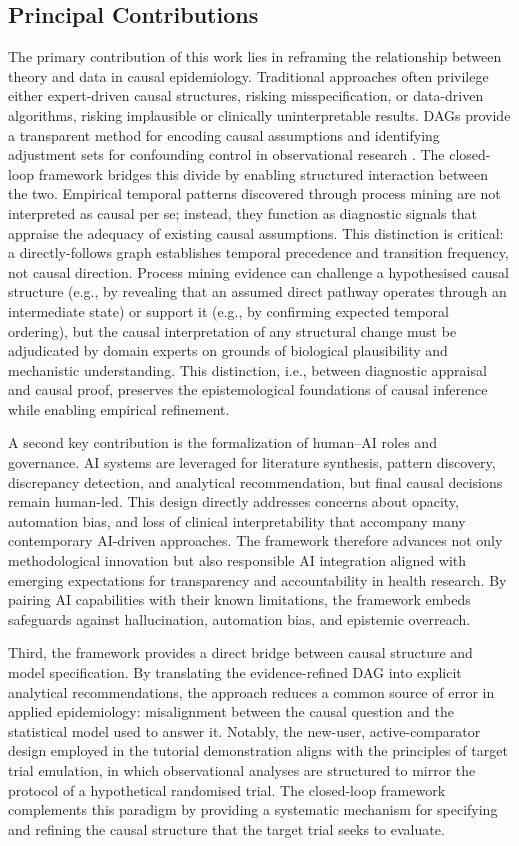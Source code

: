 \documentclass[sn-vancouver-num]{sn-jnl}
\begin{document}
\subsection{Principal Contributions}
The primary contribution of this work lies in reframing the relationship between theory and data in causal epidemiology. Traditional approaches often privilege either expert-driven causal structures, risking misspecification, or data-driven algorithms, risking implausible or clinically uninterpretable results. DAGs provide a transparent method for encoding causal assumptions and identifying adjustment sets for confounding control in observational research \citep{tennant2021}. The closed-loop framework bridges this divide by enabling structured interaction between the two. Empirical temporal patterns discovered through process mining are not interpreted as causal per se; instead, they function as diagnostic signals that appraise the adequacy of existing causal assumptions. This distinction is critical: a directly-follows graph establishes temporal precedence and transition frequency, not causal direction. Process mining evidence can challenge a hypothesised causal structure (e.g., by revealing that an assumed direct pathway operates through an intermediate state) or support it (e.g., by confirming expected temporal ordering), but the causal interpretation of any structural change must be adjudicated by domain experts on grounds of biological plausibility and mechanistic understanding. This distinction, i.e., between diagnostic appraisal and causal proof, preserves the epistemological foundations of causal inference while enabling empirical refinement.

A second key contribution is the formalization of human--AI roles and governance. AI systems are leveraged for literature synthesis, pattern discovery, discrepancy detection, and analytical recommendation, but final causal decisions remain human-led. This design directly addresses concerns about opacity, automation bias, and loss of clinical interpretability that accompany many contemporary AI-driven approaches. The framework therefore advances not only methodological innovation but also responsible AI integration aligned with emerging expectations for transparency and accountability in health research. By pairing AI capabilities with their known limitations, the framework embeds safeguards against hallucination, automation bias, and epistemic overreach.

Third, the framework provides a direct bridge between causal structure and model specification. By translating the evidence-refined DAG into explicit analytical recommendations, the approach reduces a common source of error in applied epidemiology: misalignment between the causal question and the statistical model used to answer it. Notably, the new-user, active-comparator design employed in the tutorial demonstration aligns with the principles of target trial emulation, in which observational analyses are structured to mirror the protocol of a hypothetical randomised trial. The closed-loop framework complements this paradigm by providing a systematic mechanism for specifying and refining the causal structure that the target trial seeks to evaluate.
\end{document}
